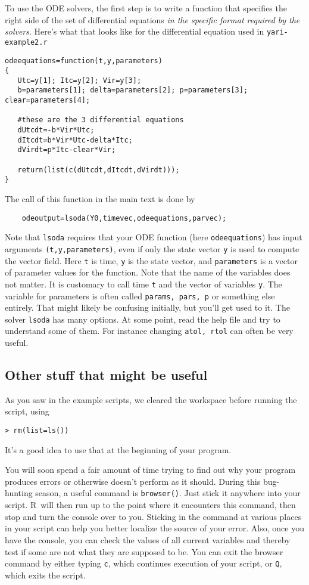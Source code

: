 \documentclass [11pt]{article}
\newcommand{\ttt}[1]{{\tt #1}}
\newcommand{\code}[1]{{\tt #1}}
\newcommand\R{{\sf R}}
\numberwithin{exercise}{section}
\begin{document}
To use the ODE solvers, the first step is to write a function that specifies the right side of the set of differential equations 
\textit{in the specific format required by the solvers}. Here's what that looks like for the differential equation used in \code{yari-example2.r}
\begin{verbatim}
odeequations=function(t,y,parameters) 
{ 
   Utc=y[1]; Itc=y[2]; Vir=y[3];  
   b=parameters[1]; delta=parameters[2]; p=parameters[3]; clear=parameters[4]; 
	 
   #these are the 3 differential equations
   dUtcdt=-b*Vir*Utc;
   dItcdt=b*Vir*Utc-delta*Itc;
   dVirdt=p*Itc-clear*Vir;

   return(list(c(dUtcdt,dItcdt,dVirdt))); 
} 
\end{verbatim} 
The call of this function in the main text is done by
\begin{verbatim}
	odeoutput=lsoda(Y0,timevec,odeequations,parvec);
\end{verbatim}
Note that \code{lsoda} requires that your ODE function (here \code{odeequations}) has input arguments \ttt{(t,y,parameters)}, even if only the state
vector \ttt{y} is used to compute the vector field. Here \ttt{t} is time, \ttt{y} is the state vector, and \ttt{parameters} is a vector of parameter values for the function. Note that the name of the variables does not matter. It is customary to call time \code{t} and the vector of variables \code{y}. The variable for parameters is often called \code{params, pars, p} or something else entirely. That might likely be confusing initially, but you'll get used to it. The solver \code{lsoda} has many options. At some point, read the help file and try to understand some of them. For instance changing \code{atol, rtol} can often be very useful.



\subsection{Other stuff that might be useful} 
As you saw in the example scripts, we cleared the workspace before running the script, using
\begin{verbatim}
> rm(list=ls())
\end{verbatim}
It's a good idea to use that at the beginning of your program.

You will soon spend a fair amount of time trying to find out why your program produces errors or otherwise doesn't perform as it should. During this bug-hunting season, a useful command is \code{browser()}. Just stick it anywhere into your script. \R\ will then run up to the point where it encounters this command, then stop and turn the console over to you. Sticking in the command at various places in your script can help you better localize the source of your error. Also, once you have the console, you can check the values of all current variables and thereby test if some are not what they are supposed to be. You can exit the browser command by either typing \code{c}, which continues execution of your script, or \code{Q}, which exits the script.
\end{document}
